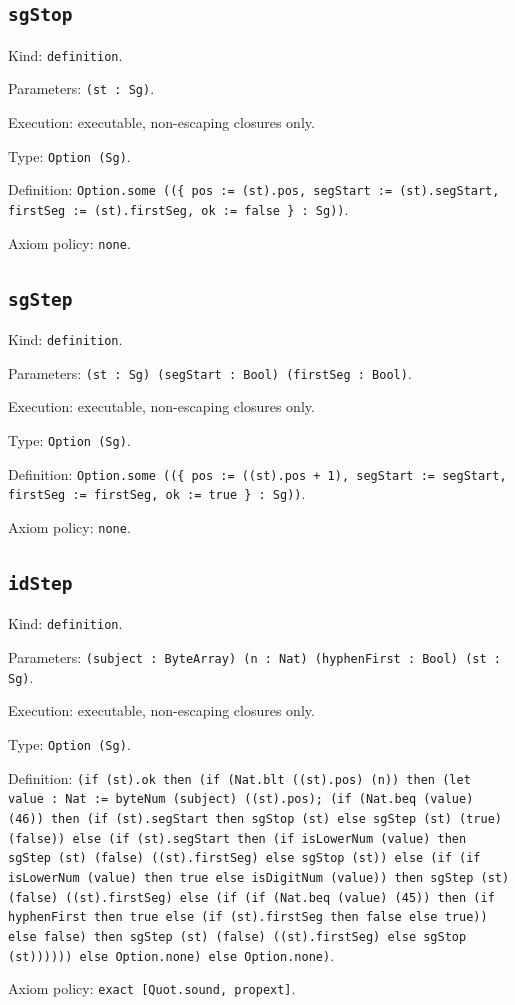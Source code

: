 \documentclass[11pt]{article}
\begin{document}
\subsection*{\texttt{sgStop}}
\noindent Kind: \texttt{definition}.\par
\noindent Parameters: \texttt{(st : Sg)}.\par
\noindent Execution: executable, non-escaping closures only.\par
\noindent Type: \texttt{Option (Sg)}.\par
\noindent Definition: \texttt{Option.some ((\{ pos := (st).pos, segStart := (st).segStart, firstSeg := (st).firstSeg, ok := false \} : Sg))}.\par
\noindent Axiom policy: \texttt{none}.\par
\subsection*{\texttt{sgStep}}
\noindent Kind: \texttt{definition}.\par
\noindent Parameters: \texttt{(st : Sg) (segStart : Bool) (firstSeg : Bool)}.\par
\noindent Execution: executable, non-escaping closures only.\par
\noindent Type: \texttt{Option (Sg)}.\par
\noindent Definition: \texttt{Option.some ((\{ pos := ((st).pos + 1), segStart := segStart, firstSeg := firstSeg, ok := true \} : Sg))}.\par
\noindent Axiom policy: \texttt{none}.\par
\subsection*{\texttt{idStep}}
\noindent Kind: \texttt{definition}.\par
\noindent Parameters: \texttt{(subject : ByteArray) (n : Nat) (hyphenFirst : Bool) (st : Sg)}.\par
\noindent Execution: executable, non-escaping closures only.\par
\noindent Type: \texttt{Option (Sg)}.\par
\noindent Definition: \texttt{(if (st).ok then (if (Nat.blt ((st).pos) (n)) then (let value : Nat := byteNum (subject) ((st).pos); (if (Nat.beq (value) (46)) then (if (st).segStart then sgStop (st) else sgStep (st) (true) (false)) else (if (st).segStart then (if isLowerNum (value) then sgStep (st) (false) ((st).firstSeg) else sgStop (st)) else (if (if isLowerNum (value) then true else isDigitNum (value)) then sgStep (st) (false) ((st).firstSeg) else (if (if (Nat.beq (value) (45)) then (if hyphenFirst then true else (if (st).firstSeg then false else true)) else false) then sgStep (st) (false) ((st).firstSeg) else sgStop (st)))))) else Option.none) else Option.none)}.\par
\noindent Axiom policy: \texttt{exact [Quot.sound, propext]}.\par
\end{document}
